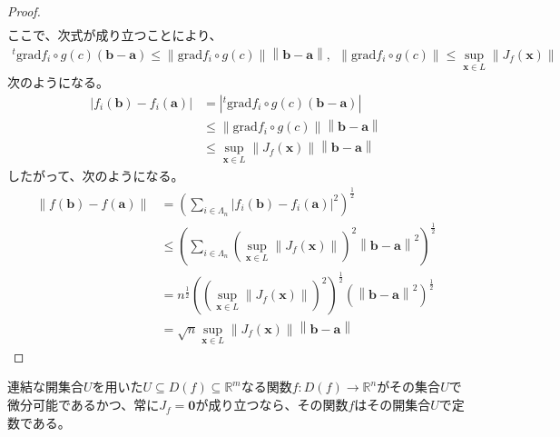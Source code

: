 \documentclass[dvipdfmx]{jsarticle}
\begin{document}
\begin{proof}
\begin{align*}
\end{align*}
ここで、次式が成り立つことにより、
\begin{align*}
{}^{t}\mathrm{grad}f_{i} \circ g(c)\left( \mathbf{b} - \mathbf{a} \right) \leq \left\| \mathrm{grad}f_{i} \circ g(c) \right\|\left\| \mathbf{b} - \mathbf{a} \right\|,\ \ \left\| \mathrm{grad}f_{i} \circ g(c) \right\| \leq \sup_{\mathbf{x} \in L}\left\| J_{f}\left( \mathbf{x} \right) \right\|
\end{align*}
次のようになる。
\begin{align*}
\left| f_{i}\left( \mathbf{b} \right) - f_{i}\left( \mathbf{a} \right) \right| &= \left|{}^{t}\mathrm{grad}f_{i} \circ g(c)\left( \mathbf{b} - \mathbf{a} \right) \right|\\
&\leq \left\| \mathrm{grad}f_{i} \circ g(c) \right\|\left\| \mathbf{b} - \mathbf{a} \right\|\\
&\leq \sup_{\mathbf{x} \in L}\left\| J_{f}\left( \mathbf{x} \right) \right\|\left\| \mathbf{b} - \mathbf{a} \right\|
\end{align*}
したがって、次のようになる。
\begin{align*}
\left\| f\left( \mathbf{b} \right) - f\left( \mathbf{a} \right) \right\| &= \left( \sum_{i \in \varLambda_{n}} \left| f_{i}\left( \mathbf{b} \right) - f_{i}\left( \mathbf{a} \right) \right|^{2} \right)^{\frac{1}{2}}\\
&\leq \left( \sum_{i \in \varLambda_{n}} {\left( \sup_{\mathbf{x} \in L}\left\| J_{f}\left( \mathbf{x} \right) \right\| \right)^{2}\left\| \mathbf{b} - \mathbf{a} \right\|^{2}} \right)^{\frac{1}{2}}\\
&= n^{\frac{1}{2}}\left( \left( \sup_{\mathbf{x} \in L}\left\| J_{f}\left( \mathbf{x} \right) \right\| \right)^{2} \right)^{\frac{1}{2}}\left( \left\| \mathbf{b} - \mathbf{a} \right\|^{2} \right)^{\frac{1}{2}}\\
&= \sqrt{n}\sup_{\mathbf{x} \in L}\left\| J_{f}\left( \mathbf{x} \right) \right\|\left\| \mathbf{b} - \mathbf{a} \right\|
\end{align*}
\end{proof}
\begin{thm}\label{4.2.6.13}
連結な開集合$U$を用いた$U \subseteq D(f) \subseteq \mathbb{R}^{m}$なる関数$f:D(f) \rightarrow \mathbb{R}^{n}$がその集合$U$で微分可能であるかつ、常に$J_{f} = \mathbf{0}$が成り立つなら、その関数$f$はその開集合$U$で定数である。
\end{thm}
\end{document}
